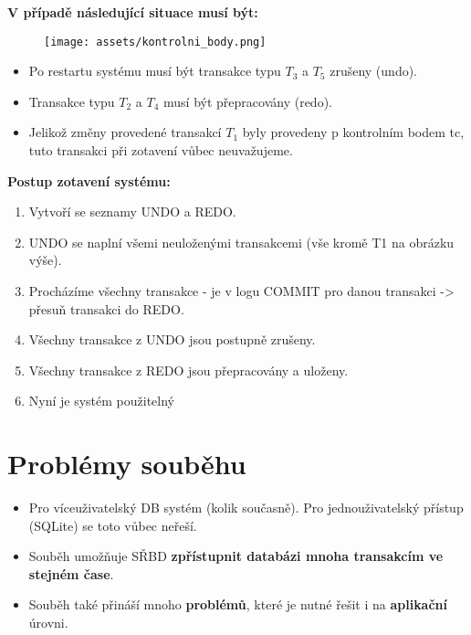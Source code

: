 \noindent \textbf{\noindent V případě následující situace musí být:}
\begin{figure}[H]
    \centering
    \texttt{[image: assets/kontrolni\_body.png]}
\end{figure}

\begin{itemize}
    \item Po restartu systému musí být transakce typu $ T_3 $ a $ T_5 $ zrušeny (undo).
    \item Transakce typu $T_2$ a $T_4$ musí být přepracovány (redo).
    \item Jelikož změny provedené transakcí $ T_1 $ byly provedeny p kontrolním bodem tc, tuto transakci při zotavení vůbec neuvažujeme.
\end{itemize}

\noindent \textbf{Postup zotavení systému:}
\begin{enumerate}
    \item Vytvoří se seznamy UNDO a REDO.
    \item UNDO se naplní všemi neuloženými transakcemi (vše kromě T1 na obrázku výše).
    \item Procházíme všechny transakce - je v logu COMMIT pro danou transakci -> přesuň transakci do REDO.
    \item Všechny transakce z UNDO jsou postupně zrušeny.
    \item Všechny transakce z REDO jsou přepracovány a uloženy.
    \item Nyní je systém použitelný
\end{enumerate}

\section{Problémy souběhu}
\begin{itemize}
    \item Pro víceuživatelský DB systém (kolik současně). Pro jednouživatelský přístup (SQLite) se toto vůbec neřeší.
    \item Souběh umožňuje SŘBD \textbf{zpřístupnit databázi mnoha transakcím ve stejném čase}.
    \item Souběh také přináší mnoho \textbf{problémů}, které je nutné řešit i na \textbf{aplikační} úrovni.
\end{itemize}

